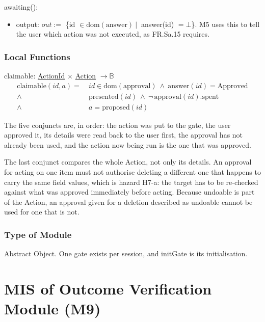 \documentclass[12pt, titlepage]{article}
\newcommand{\B}{\mathbb{B}}
\newcommand{\nil}{\bot}
\begin{document}
\noindent awaiting():
\begin{itemize}
\item output: $out :=$ \{id $\in \mathrm{dom}(\text{answer})\ |\ $ answer(id)
$= \nil$\}. M5 uses this to tell the user which action was not executed, as
FR.Sa.15 requires.
\end{itemize}

\subsubsection{Local Functions}

\noindent claimable: \hyperref[type:ActionId]{ActionId} $\times$
\hyperref[type:Action]{Action} $\to \B$
\begin{align*}
\text{claimable}(id, a) = \ &id \in \mathrm{dom}(\text{approval})\
\wedge\ \text{answer}(id) = \text{Approved}\\
 \wedge\ &\text{presented}(id)\
 \wedge\ \lnot\,\text{approval}(id).\text{spent}\\
 \wedge\ &a = \text{proposed}(id)
\end{align*}

\noindent The five conjuncts are, in order: the action was put to the gate, the
user approved it, its details were read back to the user first, the approval has
not already been used, and the action now being run is the one that was
approved.

\noindent The last conjunct compares the whole Action, not only its details. An
approval for acting on one item must not authorise deleting a
different one that happens to carry the same field values, which is hazard H7-a:
the target has to be re-checked against what was approved immediately before
acting. Because undoable is part of the Action, an approval given for a deletion
described as undoable cannot be used for one that is not.

\subsubsection{Type of Module}

Abstract Object. One gate exists per session, and initGate is its
initialisation.

\newpage

\section{MIS of Outcome Verification Module (M9)} \label{mod:verify}
\end{document}
